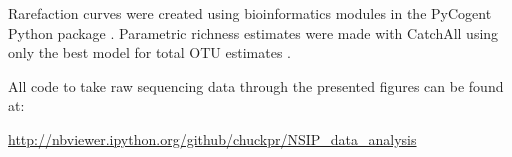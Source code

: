 Rarefaction curves were created using
bioinformatics modules in the PyCogent Python package \citep{Knight_2007}.
Parametric richness estimates were made with CatchAll using only the best model
for total OTU estimates \citep{BUNGE_2010}.

All code to take raw sequencing data through the presented figures can be
found at:

\url{http://nbviewer.ipython.org/github/chuckpr/NSIP_data_analysis}

